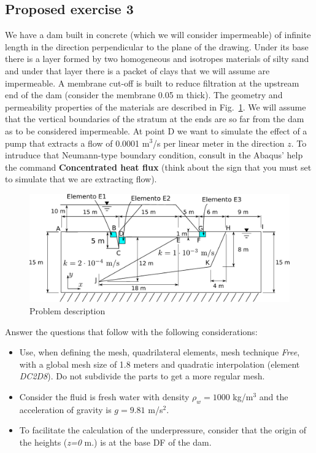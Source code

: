 \subsection{Proposed exercise 3}

We have a dam built in concrete (which we will consider impermeable)
of infinite length in the direction perpendicular to the plane of the
drawing. Under its base there is a layer formed by two homogeneous and
isotropes materials of silty sand and under that layer there is a
packet of clays that we will assume are impermeable. A membrane
cut-off is built to reduce filtration at the upstream end of the dam
(consider the membrane 0.05 m thick). The geometry and permeability
properties of the materials are described in Fig.~\ref{enup01nn}.  We
will assume that the vertical boundaries of the stratum at the ends
are so far from the dam as to be considered impermeable. At point D we
want to simulate the effect of a pump that extracts a flow of 0.0001
m$^3$/s per linear meter in the direction $z$. To intruduce that
Neumann-type boundary condition, consult in the Abaqus' help the
command \textbf{Concentrated heat flux} (think about the sign that you
must set to simulate that we are extracting flow).  \vspace{-2mm}
\begin{figure}[!h]
  \centering
  \includegraphics[width=0.99\linewidth]{./body/images/enup01}
  \caption{Problem description}
  \label{enup01nn}
\end{figure}

Answer the questions that follow with the following considerations:
\begin{itemize}
\item Use, when defining the mesh, quadrilateral elements, mesh
  technique \textit{Free}, with a global mesh size of 1.8 meters and
  quadratic interpolation (element \textit{DC2D8}). Do not subdivide
  the parts to get a more regular mesh.
\item Consider the fluid is fresh water with density $\rho_w= 1000$
  kg/m$^3$ and the acceleration of gravity is $g=9.81$ m/s$^2$.
\item To facilitate the calculation of the underpressure, consider
  that the origin of the heights (\textit{z=0} m.) is at the base DF
  of the dam.
\end{itemize}

